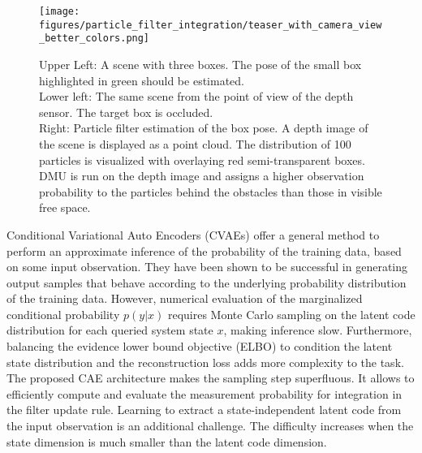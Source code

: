 \documentclass[letterpaper, 10 pt, journal, twoside]{ieeetran}  %
\begin{document}
\begin{figure}[t]
\centering
\texttt{[image: figures/particle\_filter\_integration/teaser\_with\_camera\_view\_better\_colors.png]}
\caption{Upper Left: A scene with three boxes. The pose of the small box highlighted in green should be estimated. \\
Lower left: The same scene from the point of view of the depth sensor. The target box is occluded. \\
Right: Particle filter estimation of the box pose.
A depth image of the scene is displayed as a point cloud. The distribution of 100 particles is visualized with overlaying red semi-transparent boxes. DMU is run on the depth image and assigns a higher observation probability to the particles behind the obstacles than those in visible free space.}
\label{fig:teaser}
\end{figure}
Conditional Variational Auto Encoders (CVAEs) \cite{sohn2015learning} offer a general method to perform an approximate inference of the probability of the training data, based on some input observation. They have been shown to be successful in generating output samples that behave according to the underlying probability distribution of the training data. However, numerical evaluation of the marginalized conditional probability $p(y|x)$ requires Monte Carlo sampling on the latent code distribution \cite{sohn2015learning} for each queried system state $x$, making inference slow. Furthermore, balancing the evidence lower bound objective (ELBO) to condition the latent state distribution and the reconstruction loss adds more complexity to the task.\\
The proposed CAE architecture makes the sampling step superfluous. It allows to efficiently compute and evaluate the measurement probability for integration in the filter update rule.
Learning to extract a state-independent latent code from the input observation is an additional challenge. The difficulty increases when the state dimension is much smaller than the latent code dimension.
\end{document}
